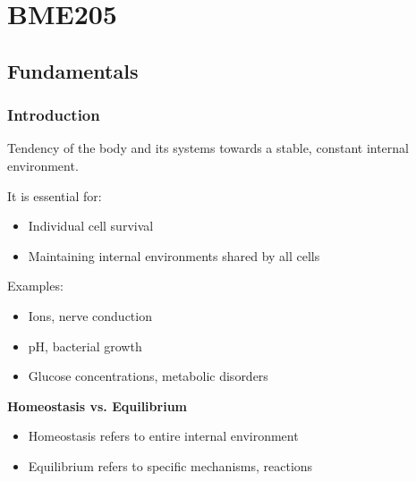\documentclass[11pt,fleqn]{book}
\begin{document}
\pagestyle{fancy} %


\part{BME205}
\chapter{Fundamentals}
\section{Introduction}
\begin{definition}[Homeostasis]
    Tendency of the body and its systems towards a stable, constant internal environment. 
    
    It is essential for:
    \begin{itemize}
        \item Individual cell survival
        \item Maintaining internal environments shared by all cells
    \end{itemize}
    Examples:
    \begin{itemize}
        \item Ions, nerve conduction
        \item pH, bacterial growth
        \item Glucose concentrations, metabolic disorders
    \end{itemize}
    \textbf{Homeostasis vs. Equilibrium}

    \begin{itemize}
        \item Homeostasis refers to entire internal environment
        \item Equilibrium refers to specific mechanisms, reactions
    \end{itemize}
\end{definition}
\end{document}
